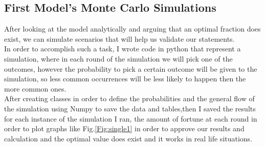 \documentclass{article}
\begin{document}
	\subsection{First Model's Monte Carlo Simulations}
	After looking at the model analytically and arguing that an optimal fraction does exist, we can simulate scenarios that will help us validate our statements.\\
	In order to accomplish such a task, I wrote code in python that represent a simulation, where in each round of the simulation we will pick one of the outcomes, however the probability to pick a certain outcome will be given to the simulation, so less common occurrences will be less likely to happen then the more common ones.\\
	After creating classes in order to define the probabilities and the general flow of the simulation using Numpy\cite{Numpy} to save the data and tables,then I saved the results for each instance of the simulation I ran, the amount of fortune at each round in order to plot graphs like Fig.\ref{Fig:single1} in order to approve our results and calculation and the optimal value does exist and it works in real life situations.\\
\end{document}
